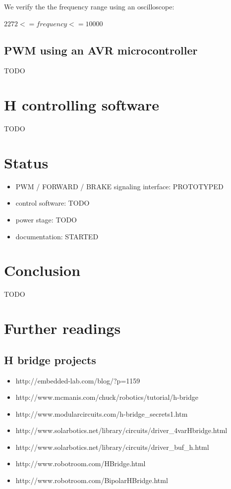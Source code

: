 \documentclass[12pt]{article}
\begin{document}
We verify the the frequency range using an oscilloscope:
\begin{center}
  $ 2272 <= frequency <= 10000 $
\end{center}

\subsection{PWM using an AVR microcontroller}
TODO

\newpage
\section{H controlling software}
TODO


\newpage
\section{Status}
\begin{itemize}
  \item PWM / FORWARD / BRAKE signaling interface: PROTOTYPED
  \item control software: TODO
  \item power stage: TODO
  \item documentation: STARTED
\end{itemize}


\newpage
\section{Conclusion}
TODO


\newpage
\section{Further readings}

\subsection{H bridge projects}
\begin{itemize}
  \item http://embedded-lab.com/blog/?p=1159
  \item http://www.mcmanis.com/chuck/robotics/tutorial/h-bridge
  \item http://www.modularcircuits.com/h-bridge\_secrets1.htm
  \item http://www.solarbotics.net/library/circuits/driver\_4varHbridge.html
  \item http://www.solarbotics.net/library/circuits/driver\_buf\_h.html
  \item http://www.robotroom.com/HBridge.html
  \item http://www.robotroom.com/BipolarHBridge.html
\end{itemize}
\end{document}
